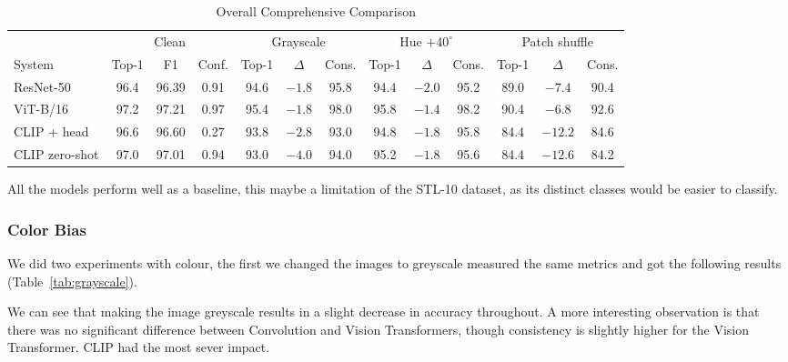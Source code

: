 \documentclass{article}
\begin{document}
\begin{table}[!htb]
  \caption{Overall Comprehensive Comparison}
  \label{tab:task1-compact}
  \centering
  \footnotesize
  \setlength{\tabcolsep}{3.2pt}
  \begin{tabular}{lcccccccccccc}
    \toprule
    & \multicolumn{3}{c}{Clean} & \multicolumn{3}{c}{Grayscale} & \multicolumn{3}{c}{Hue $+40^\circ$} & \multicolumn{3}{c}{Patch shuffle} \\
    \cmidrule(lr){2-4} \cmidrule(lr){5-7} \cmidrule(lr){8-10} \cmidrule(lr){11-13}
    System & Top-1 & F1 & Conf. & Top-1 & $\Delta$ & Cons. & Top-1 & $\Delta$ & Cons. & Top-1 & $\Delta$ & Cons. \\
    \midrule
    ResNet-50      & 96.4 & 96.39 & 0.91 & 94.6 & $-1.8$ & 95.8 & 94.4 & $-2.0$ & 95.2 & 89.0 & $-7.4$  & 90.4 \\
    ViT-B/16       & 97.2 & 97.21 & 0.97 & 95.4 & $-1.8$ & 98.0 & 95.8 & $-1.4$ & 98.2 & 90.4 & $-6.8$  & 92.6 \\
    CLIP + head    & 96.6 & 96.60 & 0.27 & 93.8 & $-2.8$ & 93.0 & 94.8 & $-1.8$ & 95.8 & 84.4 & $-12.2$ & 84.6 \\
    CLIP zero-shot & 97.0 & 97.01 & 0.94 & 93.0 & $-4.0$ & 94.0 & 95.2 & $-1.8$ & 95.6 & 84.4 & $-12.6$ & 84.2 \\
    \bottomrule
  \end{tabular}
\end{table}

All the models perform well as a baseline, this maybe a limitation of the STL-10 dataset, as its distinct classes would be easier to classify.


\subsubsection{Color Bias}

We did two experiments with colour, the first we changed the images to greyscale measured the same metrics and got the following results (Table~\ref{tab:grayscale}).


We can see that making the image greyscale results in a slight decrease in accuracy throughout. A more interesting observation is that there was no significant difference between Convolution and Vision Transformers, 
though consistency is slightly higher for the Vision Transformer. CLIP had the most sever impact. 
\end{document}
